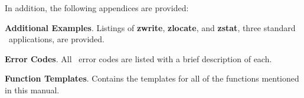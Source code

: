 In addition, the following appendices are provided:

\begin{description}
\item {\bf Additional Examples}.  Listings of
{\bf zwrite}, {\bf zlocate}, and {\bf zstat}, three standard \Zephyr\
applications, are provided.
\item {\bf Error Codes}.  All \Zephyr\ error codes are
listed with a brief description of each.
\item {\bf Function Templates}.  Contains the templates
for all of the functions mentioned in this manual.
\end{description}
